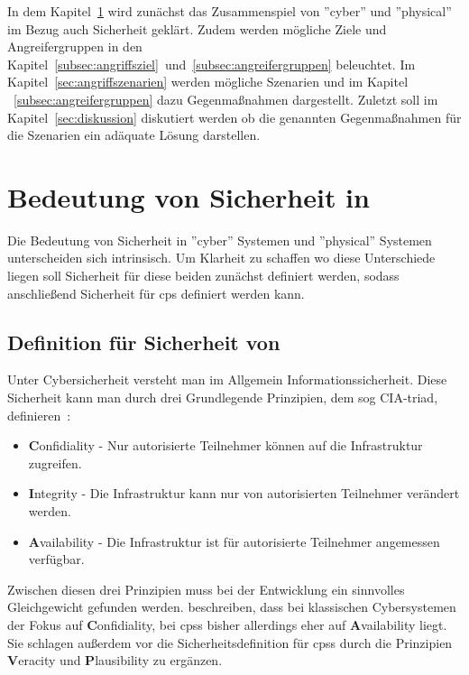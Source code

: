 \documentclass[final,bibliography=totocnumbered]{include/sikseminar}
\newcommand{\fb}[1]{\dofb#1}
\newcommand{\dofb}[1]{\textbf{#1}\nobreak\hspace{0pt}}
\begin{document}
In dem Kapitel~\ref{sec:bedeutung-sicherheit} wird zunächst das Zusammenspiel von ''cyber'' und ''physical'' im Bezug auch Sicherheit geklärt.
Zudem werden mögliche Ziele und Angreifergruppen in den Kapitel~\ref{subsec:angriffsziel}~und~\ref{subsec:angreifergruppen} beleuchtet.
Im Kapitel~\ref{sec:angriffszenarien} werden mögliche Szenarien und im Kapitel ~\ref{subsec:angreifergruppen} dazu Gegenmaßnahmen dargestellt.
Zuletzt soll im Kapitel~\ref{sec:diskussion} diskutiert werden ob die genannten Gegenmaßnahmen  für die Szenarien ein adäquate Lösung darstellen.


\section{Bedeutung von Sicherheit in }\label{sec:bedeutung-sicherheit}
Die Bedeutung von Sicherheit in ''cyber'' Systemen und ''physical'' Systemen unterscheiden sich intrinsisch.
Um Klarheit zu schaffen wo diese Unterschiede liegen soll Sicherheit für diese beiden zunächst definiert werden, sodass anschließend Sicherheit für \gls{cps} definiert werden kann.

\subsection{Definition für Sicherheit von }\label{subsec:definition}
Unter Cybersicherheit versteht man im Allgemein Informationssicherheit.
Diese Sicherheit kann man durch drei Grundlegende Prinzipien, dem sog CIA-triad, definieren~\cite[,S.~2]{Cherdantseva2013,SFJ17a}:
\begin{itemize}[noitemsep,nolistsep]
\item \fb{Confidiality} - Nur autorisierte Teilnehmer können auf die Infrastruktur zugreifen.
\item \fb{Integrity} - Die Infrastruktur kann nur von autorisierten Teilnehmer verändert werden.
\item \fb{Availability} - Die Infrastruktur ist für autorisierte Teilnehmer angemessen verfügbar.
\end{itemize}
Zwischen diesen drei Prinzipien muss bei der Entwicklung ein sinnvolles Gleichgewicht gefunden werden.
\citeauthor{GK16} beschreiben, dass bei klassischen Cybersystemen der Fokus auf \fb{Confidiality}, bei \glspl{cps} bisher allerdings eher auf \fb{Availability} liegt.
Sie schlagen außerdem vor die Sicherheitsdefinition für \glspl{cps} durch die Prinzipien \fb{Veracity} und \fb{Plausibility} zu ergänzen.
\end{document}
